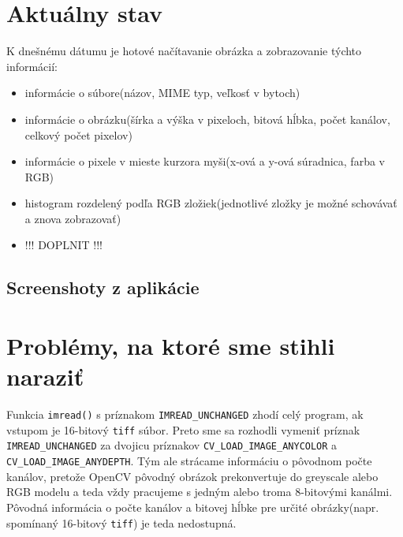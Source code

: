 \documentclass[12pt,a4paper,titlepage,final]{article}
\begin{document}
\section{Aktuálny stav}
K dnešnému dátumu je hotové načítavanie obrázka a zobrazovanie týchto informácií:
\begin{itemize}
	\item informácie o súbore(názov, MIME typ, veľkosť v bytoch)
	\item informácie o obrázku(šírka a výška v pixeloch, bitová hĺbka, počet kanálov, celkový počet pixelov)
	\item informácie o pixele v mieste kurzora myši(x-ová a y-ová súradnica, farba v RGB)
	\item histogram rozdelený podľa RGB zložiek(jednotlivé zložky je možné schovávať a znova zobrazovať)
	\item !!! DOPLNIT !!!
\end{itemize}
\subsection{Screenshoty z aplikácie}

\section{Problémy, na ktoré sme stihli naraziť}
Funkcia \verb|imread()| s príznakom \verb|IMREAD_UNCHANGED| zhodí celý program, ak vstupom je 16-bitový \verb|tiff| súbor. Preto sme sa rozhodli vymeniť príznak \verb|IMREAD_UNCHANGED| za dvojicu príznakov \verb|CV_LOAD_IMAGE_ANYCOLOR| a \verb|CV_LOAD_IMAGE_ANYDEPTH|. Tým ale strácame informáciu o pôvodnom počte kanálov, pretože OpenCV pôvodný obrázok prekonvertuje do greyscale alebo RGB modelu a teda vždy pracujeme s jedným alebo troma 8-bitovými kanálmi. Pôvodná informácia o počte kanálov a bitovej hĺbke pre určité obrázky(napr. spomínaný 16-bitový \verb|tiff|) je teda nedostupná.

\newpage
\end{document}
